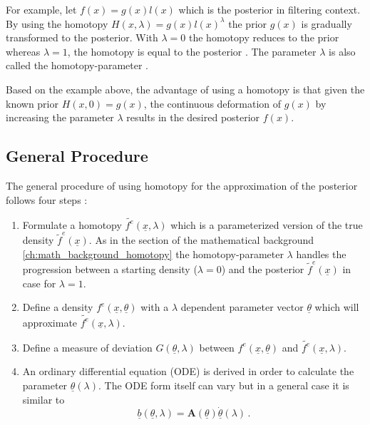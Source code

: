 \documentclass[a4paper]{IEEEtran}
\begin{document}
For example, let $f(x)=g(x)l(x)$ which is the posterior in filtering context. By using the homotopy $H(x, \lambda) = g(x)l(x)^{\lambda}$ the prior
$g(x)$ is gradually transformed to the posterior. With $\lambda = 0$ the homotopy reduces to the prior whereas $\lambda = 1$, the homotopy is equal to the posterior \cite{daum2007}. The parameter $\lambda$ is also called the homotopy-parameter \cite{liao2012}.

Based on the example above, the advantage of using a homotopy is that given the known prior $H(x,0)=g(x)$, the continuous deformation of $g(x)$ by increasing the parameter $\lambda$ 
results in the desired posterior $f(x)$. 

\subsection{General Procedure}
\label{ch:general_idea_homotopy}
The general procedure of using homotopy for the approximation of the posterior follows four steps \cite{hanebeck2003}:
\begin{enumerate}
    \item Formulate a homotopy $\tilde{f^e}(\underline{x},\lambda)$ which is a parameterized version of the true density $\tilde{f}^{e}(\underline{x})$. As in the section of the mathematical background \ref{ch:math_background_homotopy}
    the homotopy-parameter $\lambda$ handles the progression between a starting density ($\lambda = 0$) and the posterior $\tilde{f}^e(\underline{x})$ in case for $\lambda = 1$.
    \item Define a density $f^e(\underline{x}, \underline{\theta})$ with a $\lambda$ dependent parameter vector $\underline{\theta}$ which will approximate $\tilde{f^e}(\underline{x},\lambda)$.
    \item Define a measure of deviation $G(\underline{\theta}, \lambda)$ between $f^e(\underline{x}, \underline{\theta})$ and $\tilde{f^e}(\underline{x},\lambda)$.
    \item An ordinary differential equation (ODE) is derived in order to calculate the parameter $\underline{\theta}(\lambda)$. The ODE form itself can vary but in a general case it is similar to
    \begin{equation}
        \underline{b}(\underline{\theta}, \lambda) = \textbf{A}(\underline{\theta})\underline{\dot{\theta}}(\lambda) \,.
        \label{eq:ode_general}
    \end{equation}
\end{enumerate}
\end{document}
